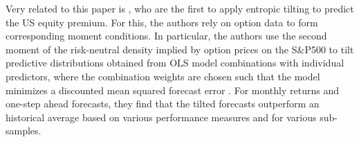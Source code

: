 %
\indent Very related to this paper is \cite{metaxoglou2016}, who are the first to apply entropic tilting to predict the US equity premium. For this, the authors rely on option data to form corresponding  moment conditions. In particular, the authors use the second moment of the risk-neutral density implied by option prices on the S\&P500 to tilt predictive distributions obtained from OLS model combinations with individual predictors, where the combination weights are chosen such that the model minimizes a discounted mean squared forecast error \citep{rapach2013}. For monthly returns and one-step ahead forecasts, they find that the tilted forecasts outperform an historical average based on various performance measures and for various sub-samples.
%

